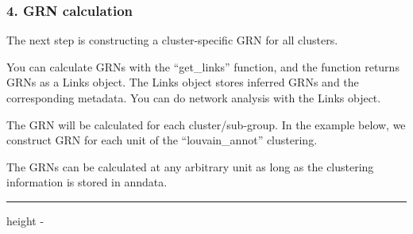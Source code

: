 \documentclass[letterpaper,10pt,english]{sphinxmanual}
\newlength\nbsphinxcodecellspacing
\begin{document}
{
\begin{sphinxVerbatim}[commandchars=\\\{\}]
\llap{\color{nbsphinxin}[19]:\,\hspace{\fboxrule}\hspace{\fboxsep}}
\end{sphinxVerbatim}
}


\subsubsection{4. GRN calculation}
\label{\detokenize{notebooks/04_Network_analysis/Network_analysis_with_with_Paul_etal_2015_data:4.-GRN-calculation}}
The next step is constructing a cluster-specific GRN for all clusters.

You can calculate GRNs with the “get\_links” function, and the function returns GRNs as a Links object. The Links object stores inferred GRNs and the corresponding metadata. You can do network analysis with the Links object.

The GRN will be calculated for each cluster/sub-group. In the example below, we construct GRN for each unit of the “louvain\_annot” clustering.

The GRNs can be calculated at any arbitrary unit as long as the clustering information is stored in anndata.

{
\begin{sphinxVerbatim}[commandchars=\\\{\}]
\llap{\color{nbsphinxin}[20]:\,\hspace{\fboxrule}\hspace{\fboxsep}}
 
\end{sphinxVerbatim}
}

\hrule height -\fboxrule\relax
\vspace{\nbsphinxcodecellspacing}

\makeatletter\setbox\nbsphinxpromptbox\box\voidb@x\makeatother
\end{document}
